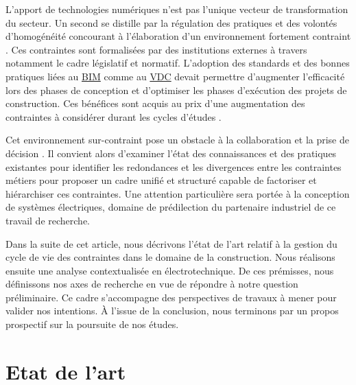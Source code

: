 \documentclass[a4paper,12pt]{article}
\begin{document}
L’apport de technologies numériques n’est pas l’unique vecteur de transformation du secteur. Un second se distille par la régulation des pratiques et des volontés d'homogénéité concourant à l’élaboration d’un environnement fortement contraint \autocite{benzerafa-alilatLinflationNormativeLamplification2022a}. Ces contraintes sont formalisées par des institutions externes \autocite{artokiviniemiPREMISSRequirementsManagement2004} à travers notamment le cadre législatif et normatif. L’adoption des standards et des bonnes pratiques liées au \protect\hyperlink{gls-1}{\label{gls-1-use-9}BIM} comme au \protect\hyperlink{gls-3}{\label{gls-3-use-5}VDC} devait permettre d’augmenter l’efficacité lors des phases de conception et d’optimiser les phases d’exécution des projets de construction. Ces bénéfices sont acquis au prix d’une augmentation des contraintes à considérer durant les cycles d’études \autocite{shahruddinBIMRequirementsConstruction2020a}. 

Cet environnement sur-contraint pose un obstacle à la collaboration et la prise de décision \autocite{adriennecostaConstructionNormeLarchitecte2012}. Il convient alors d'examiner l'état des connaissances et des pratiques existantes pour identifier les redondances et les divergences entre  les contraintes métiers pour proposer un cadre unifié et structuré capable de factoriser et hiérarchiser ces contraintes. Une attention particulière sera portée à la conception de systèmes électriques, domaine de prédilection du partenaire industriel de ce travail de recherche.

Dans la suite de cet article, nous décrivons l’état de l’art relatif à la gestion du cycle de vie des contraintes dans le domaine de la construction. Nous réalisons ensuite une analyse contextualisée en électrotechnique. De ces prémisses, nous définissons nos axes de recherche en vue de répondre à notre question préliminaire. Ce cadre s’accompagne des perspectives de travaux à mener pour valider nos intentions. À l'issue de la conclusion, nous terminons par un propos prospectif sur la poursuite de nos études.
\section{Etat de l’art}
\label{sec:org02c6b40}
\end{document}
